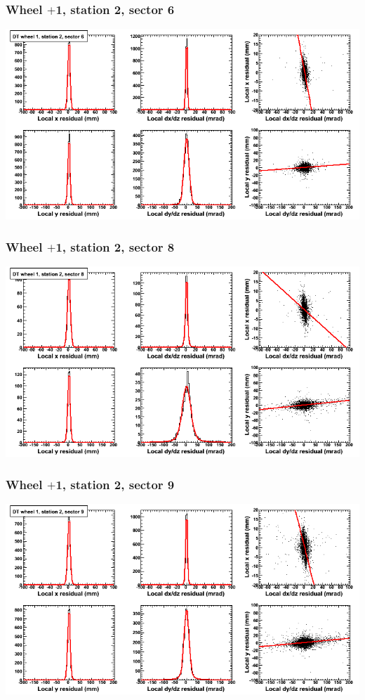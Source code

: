 \documentclass[compress]{beamer}
\begin{document}
\begin{frame}
\frametitle{Wheel $+$1, station 2, sector 6}
\includegraphics[width=\linewidth]{tmpbell_MBwhDst2sec06.png}
\end{frame}

\begin{frame}
\frametitle{Wheel $+$1, station 2, sector 8}
\includegraphics[width=\linewidth]{tmpbell_MBwhDst2sec08.png}
\end{frame}

\begin{frame}
\frametitle{Wheel $+$1, station 2, sector 9}
\includegraphics[width=\linewidth]{tmpbell_MBwhDst2sec09.png}
\end{frame}
\end{document}
